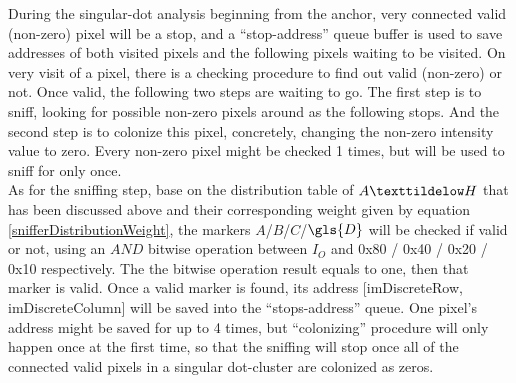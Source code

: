 %
During the singular-dot analysis beginning from the anchor, very connected valid (non-zero) pixel will be a stop, and a \enquote{stop-address} queue buffer is used to save addresses of both visited pixels and the following pixels waiting to be visited. On very visit of a pixel, there is a checking procedure to find out valid (non-zero) or not. Once valid, the following two steps are waiting to go. The first step is to sniff, looking for possible non-zero pixels around as the following stops. And the second step is to colonize this pixel, concretely, changing the non-zero intensity value to zero. Every non-zero pixel might be checked 1 times, but will be used to sniff for only once.%
\\\indent%
As for the sniffing step, base on the distribution table of \(A \texttildelow H\) that has been discussed above and their corresponding weight given by equation \ref{snifferDistributionWeight}, the markers \(A\)/\(B\)/\(C\)/\(\gls{D}\) will be checked if valid or not, using an \(AND\) bitwise operation between \(I_O\) and 0x80 / 0x40 / 0x20 / 0x10 respectively. The the bitwise operation result equals to one, then that marker is valid. %
%
\noindent
Once a valid marker is found, its address [\gls{imDiscreteRow}, \, \gls{imDiscreteColumn}] will be saved into the \enquote{stops-address} queue. One pixel's address might be saved for up to 4 times, but \enquote{colonizing} procedure will only happen once at the first time, so that the sniffing will stop once all of the connected valid pixels in a singular dot-cluster are colonized as zeros. %
